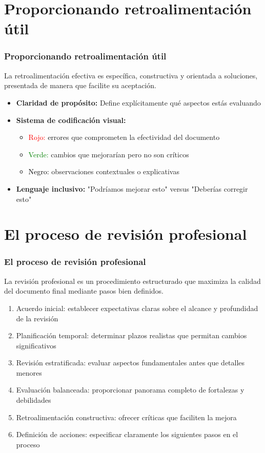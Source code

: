 \documentclass{beamer}
\begin{document}
\section{Proporcionando retroalimentación útil}
\begin{frame}
\frametitle{Proporcionando retroalimentación útil}

\textbf{} La retroalimentación efectiva es específica, constructiva y orientada a soluciones, presentada de manera que facilite su aceptación.

\vspace{0.3cm}
\begin{itemize}
\item \textbf{Claridad de propósito:} Define explícitamente qué aspectos estás evaluando
\item \textbf{Sistema de codificación visual:}
  \begin{itemize}
  \item \textcolor{red}{Rojo:} errores que comprometen la efectividad del documento
  \item \textcolor{green}{Verde:} cambios que mejorarían pero no son críticos
  \item \textcolor{black}{Negro:} observaciones contextuales o explicativas
  \end{itemize}
\item \textbf{Lenguaje inclusivo:} "Podríamos mejorar esto" versus "Deberías corregir esto"
\end{itemize}
\end{frame}


\section{El proceso de revisión profesional}
\begin{frame}
\frametitle{El proceso de revisión profesional}

\textbf{} La revisión profesional es un procedimiento estructurado que maximiza la calidad del documento final mediante pasos bien definidos.

\vspace{0.3cm}
\begin{enumerate}
\item Acuerdo inicial: establecer expectativas claras sobre el alcance y profundidad de la revisión
\item Planificación temporal: determinar plazos realistas que permitan cambios significativos
\item Revisión estratificada: evaluar aspectos fundamentales antes que detalles menores
\item Evaluación balanceada: proporcionar panorama completo de fortalezas y debilidades
\item Retroalimentación constructiva: ofrecer críticas que faciliten la mejora
\item Definición de acciones: especificar claramente los siguientes pasos en el proceso
\end{enumerate}
\end{frame}
\end{document}
